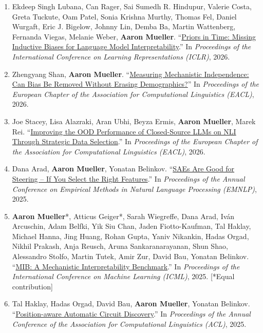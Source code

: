 \documentclass[10pt]{article}
\providecommand*\titlelink[2]{\href{#1}{\textcolor{accent}{#2}}}
\begin{document}
\begin{enumerate}[leftmargin=*, topsep=0pt, itemsep=0.25ex, partopsep=0ex, parsep=1ex, label=C\arabic*., ref=C\arabic*]
	\item Ekdeep Singh Lubana, Can Rager, Sai Sumedh R. Hindupur, Valerie Costa, Greta Tuckute, Oam Patel, Sonia Krishna Murthy, Thomas Fel, Daniel Wurgaft, Eric J. Bigelow, Johnny Lin, Demba Ba, Martin Wattenberg, Fernanda Viegas, Melanie Weber, \textbf{Aaron Mueller}. ``\titlelink{https://arxiv.org/abs/2511.01836}{Priors in Time: Missing Inductive Biases for Language Model Interpretability}.'' In \emph{Proceedings of the International Conference on Learning Representations (ICLR)}, 2026.

	\item Zhengyang Shan, \textbf{Aaron Mueller}. ``\titlelink{https://arxiv.org/abs/2512.20796}{Measuring Mechanistic Independence: Can Bias Be Removed Without Erasing Demographics?}'' In \emph{Proceedings of the European Chapter of the Association for Computational Linguistics (EACL)}, 2026.
	
	\item Joe Stacey, Lisa Alazraki, Aran Ubhi, Beyza Ermis, \textbf{Aaron Mueller}, Marek Rei. ``\titlelink{https://arxiv.org/abs/2505.20209}{Improving the OOD Performance of Closed-Source LLMs on NLI Through Strategic Data Selection}.'' In \emph{Proceedings of the European Chapter of the Association for Computational Linguistics (EACL)}, 2026.
	
	\item Dana Arad, \textbf{Aaron Mueller}, Yonatan Belinkov. ``\titlelink{https://arxiv.org/abs/2505.20063}{SAEs Are Good for Steering -- If You Select the Right Features}.'' In \emph{Proceedings of the Annual Conference on Empirical Methods in Natural Language Processing (EMNLP)}, 2025.\label{pub:sae-steering}
	
	\item \textbf{Aaron Mueller}*, Atticus Geiger*, Sarah Wiegreffe, Dana Arad, Iván Arcuschin, Adam Belfki, Yik Siu Chan, Jaden Fiotto-Kaufman, Tal Haklay, Michael Hanna, Jing Huang, Rohan Gupta, Yaniv Nikankin, Hadas Orgad, Nikhil Prakash, Anja Reusch, Aruna Sankaranarayanan, Shun Shao, Alessandro Stolfo, Martin Tutek, Amir Zur, David Bau, Yonatan Belinkov. ``\titlelink{https://arxiv.org/abs/2504.13151}{MIB: A Mechanistic Interpretability Benchmark}.'' In \emph{Proceedings of the International Conference on Machine Learning (ICML)}, 2025. [*Equal contribution]\label{pub:mib}
	
	\item Tal Haklay, Hadas Orgad, David Bau, \textbf{Aaron Mueller}, Yonatan Belinkov. ``\titlelink{https://arxiv.org/abs/2502.04577}{Position-aware Automatic Circuit Discovery}.'' In \emph{Proceedings of the Annual Conference of the Association for Computational Linguistics (ACL)}, 2025.\label{pub:position-circuits}
	

\end{enumerate}
\end{document}
